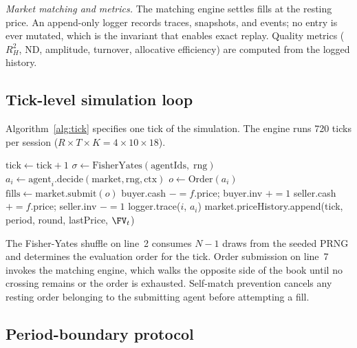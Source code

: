 \emph{Market matching and metrics.}  The matching engine settles
fills at the resting price.  An append-only logger records traces,
snapshots, and events; no entry is ever mutated, which is the
invariant that enables exact replay.  Quality metrics ($R^2_H$,
ND, amplitude, turnover, allocative efficiency) are computed from
the logged history.

\subsection{Tick-level simulation loop}

Algorithm~\ref{alg:tick} specifies one tick of the simulation.  The
engine runs 720 ticks per session ($R{\times}T{\times}K =
4{\times}10{\times}18$).

\begin{algorithm}[h]
\caption{Tick-level simulation step}
\label{alg:tick}
\begin{algorithmic}[1]
\State $\text{tick} \gets \text{tick} + 1$
\State $\sigma \gets \text{FisherYates}(\text{agentIds},\;\text{rng})$
  \State $a_i \gets \text{agent}_i.\text{decide}(\text{market},
    \text{rng}, \text{ctx})$
    \State $o \gets \text{Order}(a_i)$
    \State $\text{fills} \gets \text{market.submit}(o)$
      \State buyer.cash $\mathrel{-}= f.\text{price}$;\;
             buyer.inv $\mathrel{+}= 1$
      \State seller.cash $\mathrel{+}= f.\text{price}$;\;
             seller.inv $\mathrel{-}= 1$
    \EndFor
  \EndIf
  \State logger.trace($i$, $a_i$)
\EndFor
\State market.priceHistory.append(tick, period, round, lastPrice,
  $\FV_t$)
\end{algorithmic}
\end{algorithm}

The Fisher-Yates shuffle on line~2 consumes $N{-}1$ draws from the
seeded PRNG and determines the evaluation order for the tick.  Order
submission on line~7 invokes the matching engine, which walks the
opposite side of the book until no crossing remains or the order is
exhausted.  Self-match prevention cancels any resting order belonging
to the submitting agent before attempting a fill.

\subsection{Period-boundary protocol}

